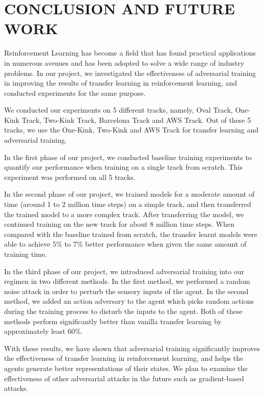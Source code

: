 
\chapter{CONCLUSION AND FUTURE WORK}

Reinforcement Learning has become a field that has found practical
applications in numerous avenues and has been adopted to solve a wide
range of industry problems. In our project, we investigated the
effectiveness of adversarial training in improving the results of
transfer learning in reinforcement learning, and conducted experiments
for the same purpose.

We conducted our experiments on 5 different tracks, namely, Oval
Track, One-Kink Track, Two-Kink Track, Barcelona Track and AWS
Track. Out of these 5 tracks, we use the One-Kink, Two-Kink and AWS
Track for transfer learning and adversarial training.

In the first phase of our project, we conducted baseline training
experiments to quantify our performance when training on a single
track from scratch. This experiment was performed on all 5 tracks.

In the second phase of our project, we trained models for a moderate
amount of time (around 1 to 2 million time steps) on a simple track,
and then transferred the trained model to a more complex track. After
transferring the model, we continued training on the new track for
about 8 million time steps. When compared with the baseline trained
from scratch, the transfer learnt models were able to achieve 5\% to
7\% better performance when given the same amount of training time.

In the third phase of our project, we introduced adversarial training
into our regimen in two different methods. In the first method, we
performed a random noise attack in order to perturb the sensory inputs
of the agent. In the second method, we added an action adversary to
the agent which picks random actions during the training process to
disturb the inputs to the agent. Both of these methods perform
significantly better than vanilla transfer learning by approximately
least 60\%.

With these results, we have shown that adversarial training
significantly improves the effectiveness of transfer learning in
reinforcement learning, and helps the agents generate better
representations of their states. We plan to examine the effectiveness
of other adversarial attacks in the future such as gradient-based
attacks.
